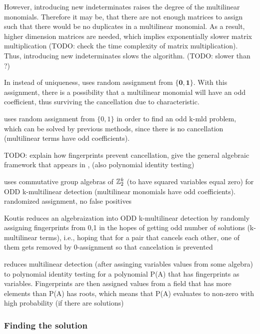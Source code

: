 However, introducing new indeterminates raises the degree of the multilinear monomials. 
Therefore it may be, that there are not enough matrices to assign such that there would be no 
duplicates in a multilinear monomial. As a result, higher dimension matrices are needed, which 
implies exponentially slower matrix multiplication (TODO: check the time complexity of matrix multiplication). 
Thus, introducing new indeterminates slows the algorithm. (TODO: slower than ?)

In \cite{Koutis08} instead of uniqueness, \citeauthor{Koutis08} uses random assignment from $\{\mathbf{0}, \mathbf{1}\}$. 
With this assignment, there is a possibility that a multilinear monomial will have an odd coefficient, 
thus surviving the cancellation due to characteristic.

\citeauthor{Koutis08} uses random assignment from $\{0, 1\}$ in order to find an odd k-mld problem, which 
can be solved by previous methods, since there is no cancellation (multilinear terms have odd coefficients).



TODO: explain how fingerprints prevent cancellation, 
give the general algebraic framework that appears in \cite{Williams09}, 
(also polynomial identity testing)

\cite{Koutis08} uses commutative group algebras of $\mathbb Z^{k}_{2}$ (to have squared variables equal zero) 
for ODD k-multilinear detection (multilinear monomials have odd coefficients). randomized assignment, no false positives

Koutis reduces an algebraization into ODD k-multilinear detection by randomly assigning fingerprints from {0,1} in the hopes 
of getting odd number of solutions (k-multilinear terms), 
i.e., hoping that for a pair that cancels each other, one of them gets removed by 0-assignment so that cancelation is prevented

\cite{Williams09} reduces multilinear detection (after assinging variables values from some algebra) 
to polynomial identity testing for a polynomial P(A) that has fingerprints as variables. 
Fingerprints are then assigned values from a field that has more elements than P(A) has roots, which 
means that P(A) evaluates to non-zero with high probability (if there are solutions)



\subsubsection{Finding the solution}


